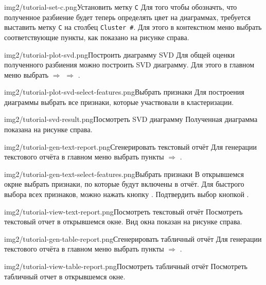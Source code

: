 \documentclass[12pt,tikz]{instruction}
\begin{document}
\begin{steps}
	\begin{ist}{img2/tutorial-set-c.png}{Установить метку \texttt{C}}
		Для того чтобы обозначть, что полученное разбиение будет теперь определять цвет на диаграммах, требуется выставить метку \texttt{C} на столбец \texttt{Cluster \#}. Для этого в контекстном меню выбрать соответствующие пункты, как показано на рисунке справа.
	\end{ist}
	\begin{ist}{img2/tutorial-plot-svd.png}{Построить диаграмму SVD}
		Для общей оценки полученного разбиения можно построить SVD диаграмму. Для этого в главном меню выбрать  $ \Rightarrow $  $ \Rightarrow $ .
	\end{ist}
	\begin{ist}{img2/tutorial-plot-svd-select-features.png}{Выбрать признаки}
		Для построения диаграммы выбрать все признаки, которые участвовали в кластеризации.
	\end{ist}
	\begin{ist}{img2/tutorial-svd-result.png}{Посмотреть SVD диаграмму}
		Полученная диаграмма показана на рисунке справа. \vspace{7cm}
	\end{ist}
	\begin{ist}{img2/tutorial-gen-text-report.png}{Сгенерировать текстовый отчёт}
		Для генерации текстового отчёта в главном меню выбрать пункты  $ \Rightarrow $ .
	\end{ist}
	\begin{ist}{img2/tutorial-gen-text-select-features.png}{Выбрать признаки}
		В открывшемся окрне выбрать признаки, по которые будут включены в отчёт. Для быстрого выбора всех признаков, можно нажать кнопку . Подтвердить выбор кнопкой .
	\end{ist}
	\begin{ist}{img2/tutorial-view-text-report.png}{Посмотреть текстовый отчёт}
		Посмотреть текстовый отчет в открывшемся окне. Вид окна показан на рисунке справа.
	\end{ist}
	\begin{ist}{img2/tutorial-gen-table-report.png}{Сгенерировать табличный отчёт}
		Для генерации текстового отчёта в главном меню выбрать пункты  $ \Rightarrow $ .
	\end{ist}
	
	\begin{ist}{img2/tutorial-view-table-report.png}{Посмотреть табличный отчёт}
		Посмотреть табличный отчет в открывшемся окне.
	\end{ist}

\end{steps}
\end{document}
